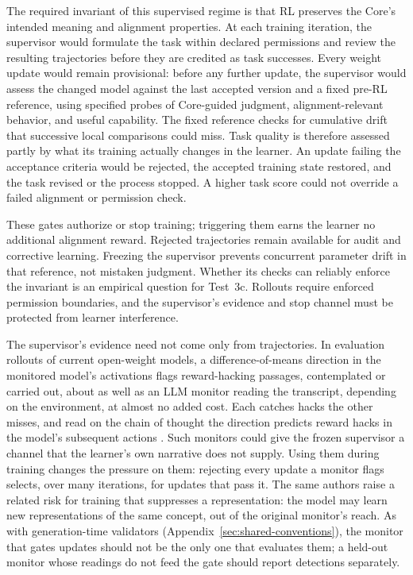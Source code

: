 \documentclass[11pt]{article}
\begin{document}
The required invariant of this supervised regime is that RL preserves the
Core's intended meaning and alignment properties. At each training iteration,
the supervisor would formulate the task within declared permissions and
review the resulting trajectories before they are credited as task successes.
Every weight update would remain provisional: before any further update, the
supervisor would assess the changed model against the last accepted version
and a fixed pre-RL reference, using specified probes of Core-guided judgment,
alignment-relevant behavior, and useful capability. The fixed reference checks
for cumulative drift that successive local comparisons could miss. Task
quality is therefore assessed partly by what its training actually changes in
the learner. An update failing the acceptance criteria would be rejected, the
accepted training state restored, and the task revised or the process stopped.
A higher task score could not override a failed alignment or permission check.

These gates authorize or stop training; triggering them earns the learner no
additional alignment reward. Rejected trajectories remain available for audit
and corrective learning. Freezing the supervisor prevents concurrent parameter
drift in that reference, not mistaken judgment. Whether its checks can reliably
enforce the invariant is an empirical question for Test~3c. Rollouts require enforced permission boundaries, and
the supervisor's evidence and stop channel must be protected from learner
interference.

The supervisor's evidence need not come only from trajectories. In evaluation
rollouts of current open-weight models, a difference-of-means direction in the monitored model's activations flags reward-hacking passages, contemplated or carried out, about as well as an LLM monitor reading the transcript, depending on the environment, at almost no
added cost. Each catches hacks the other misses, and read on the chain of
thought the direction predicts reward hacks in the model's subsequent actions
\cite{bergen2026rewardhacking}. Such monitors could give the frozen supervisor
a channel that the learner's own narrative does not supply. Using them during
training changes the pressure on them: rejecting every update a monitor flags
selects, over many iterations, for updates that pass it. The same authors raise a related risk for training that suppresses a representation: the model may learn new representations of the same concept, out of the original monitor's reach. As with
generation-time validators (Appendix~\ref{sec:shared-conventions}), the
monitor that gates updates should not be the only one that evaluates them; a
held-out monitor whose readings do not feed the gate should report detections
separately.
\end{document}
